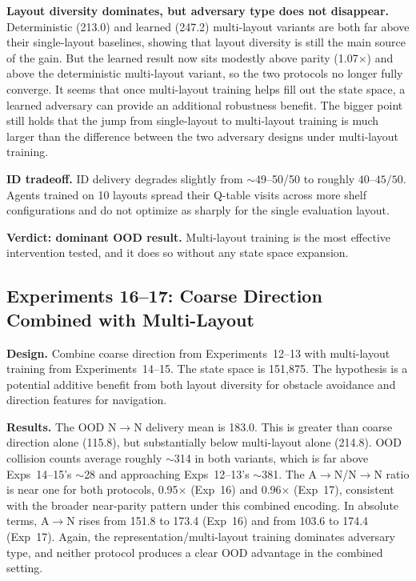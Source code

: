 \documentclass[sigconf]{aamas}
\begin{document}
\textbf{Layout diversity dominates, but adversary type does not disappear.} Deterministic
(213.0) and learned (247.2) multi-layout variants are both far above their
single-layout baselines, showing that layout diversity is still the main source of
the gain. But the learned result now sits modestly above parity
(1.07$\times$) and above the deterministic multi-layout variant, so the two
protocols no longer fully converge. It seems that once multi-layout training helps fill out the state space, a learned adversary can provide an additional robustness benefit. The bigger point still holds that the jump from
single-layout to multi-layout training is much larger than the difference between
the two adversary designs under multi-layout training.

\textbf{ID tradeoff.} ID delivery degrades slightly from $\sim$49--50/50 to roughly
$40$--$45/50$. Agents
trained on 10 layouts spread their Q-table visits across more shelf configurations
and do not optimize as sharply for the single evaluation layout.

\textbf{Verdict: dominant OOD result.} Multi-layout training is the most effective
intervention tested, and it does so without any state space expansion.

\subsection{Experiments 16--17: Coarse Direction Combined with Multi-Layout}
\textbf{Design.} Combine coarse direction from Experiments~12--13 with multi-layout training from Experiments~14--15. The state space is 151,875. The hypothesis is a potential additive benefit from both layout
diversity for obstacle avoidance and direction features for navigation.

\textbf{Results.} The OOD N$\to$N delivery mean is 183.0. This is greater than coarse direction alone (115.8), but substantially below multi-layout alone (214.8). OOD collision counts average roughly $\sim$314 in both variants, which is far above
Exps~14--15's $\sim$28 and approaching Exps~12--13's $\sim$381. The
A$\to$N/N$\to$N ratio is near one for both protocols, 0.95$\times$ (Exp~16) and
0.96$\times$ (Exp~17), consistent with the broader near-parity pattern under this
combined encoding. In absolute terms, A$\to$N rises from 151.8 to 173.4 (Exp~16)
and from 103.6 to 174.4 (Exp~17). Again, the representation/multi-layout training
dominates adversary type, and neither protocol produces a clear OOD advantage in
the combined setting. 
\end{document}
